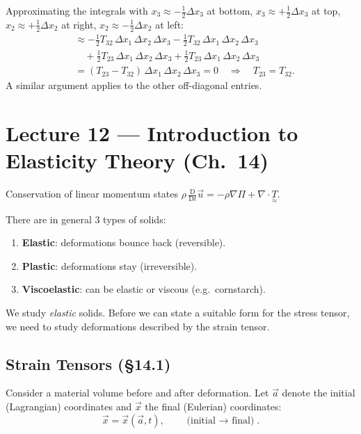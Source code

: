 \documentclass[11pt,a4paper]{article}
\newcommand{\D}{\mathrm{D}}
\newcommand{\Dt}{\frac{\D}{\D t}}
\newcommand{\xv}{\vec{x}}
\newcommand{\uv}{\vec{u}}
\newcommand{\tens}[1]{\underset{\approx}{#1}}
\begin{document}
Approximating the integrals with $x_3 \approx -\tfrac{1}{2}\Delta x_3$ at bottom, $x_3 \approx +\tfrac{1}{2}\Delta x_3$ at top, $x_2 \approx +\tfrac{1}{2}\Delta x_2$ at right, $x_2 \approx -\tfrac{1}{2}\Delta x_2$ at left:
\begin{align*}
    &\approx -\tfrac{1}{2}T_{32}\,\Delta x_1\,\Delta x_2\,\Delta x_3
    - \tfrac{1}{2}T_{32}\,\Delta x_1\,\Delta x_2\,\Delta x_3 \\
    &\quad + \tfrac{1}{2}T_{23}\,\Delta x_1\,\Delta x_2\,\Delta x_3
    + \tfrac{1}{2}T_{23}\,\Delta x_1\,\Delta x_2\,\Delta x_3 \\
    &= (T_{23} - T_{32})\,\Delta x_1\,\Delta x_2\,\Delta x_3 = 0
    \quad \Longrightarrow \quad T_{23} = T_{32}.
\end{align*}
A similar argument applies to the other off-diagonal entries.

\section{Lecture 12 --- Introduction to Elasticity Theory (Ch.\ 14)}

Conservation of linear momentum states $\rho\,\Dt\uv = -\rho\nabla\Pi + \nabla\cdot\tens{T}$.

There are in general 3 types of solids:
\begin{enumerate}[label=(\roman*)]
    \item \textbf{Elastic}: deformations bounce back (reversible).
    \item \textbf{Plastic}: deformations stay (irreversible).
    \item \textbf{Viscoelastic}: can be elastic or viscous (e.g.\ cornstarch).
\end{enumerate}

We study \emph{elastic} solids. Before we can state a suitable form for the stress tensor, we need to study deformations described by the strain tensor.

\subsection{Strain Tensors (\S14.1)}

Consider a material volume before and after deformation. Let $\vec{a}$ denote the initial (Lagrangian) coordinates and $\xv$ the final (Eulerian) coordinates:
\[
    \xv = \xv(\vec{a}, t), \qquad \text{(initial $\to$ final)}.
\]
\end{document}

